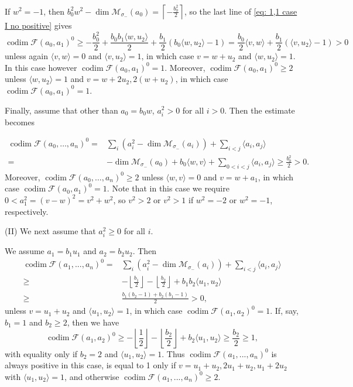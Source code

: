 \documentclass[leqno,11pt]{amsart}
\def\codim{\mathop{\mathrm{codim}}\nolimits}
\def\dim{\mathop{\mathrm{dim}}\nolimits}
\theoremstyle{definition}
\def\FF{\ensuremath{\mathcal F}}
\def\MM{\ensuremath{\mathcal M}}
\begin{document}
If $w^2=-1$, then $b_0^2w^2-\dim\MM_{\sigma_-}(a_0)=\left\lceil-\frac{b_0^2}{2}\right\rceil$, so the last line of \eqref{eq: 1,1 case I no positive} gives $$\codim\FF(a_0,a_1)^0\geq-\frac{b_0^2}{2}+\frac{b_0 b_1\langle w,u_2\rangle}{2}+\frac{b_1}{2}(b_0\langle w,u_2\rangle-1)=\frac{b_0}{2}\langle v,w\rangle+\frac{b_1}{2}(\langle v,u_2\rangle-1)>0$$
unless again $\langle v,w\rangle=0$ and $\langle v,u_2\rangle=1$, in which case $v=w+u_2$ and $\langle w,u_2\rangle=1$.  In this case however $\codim \FF(a_0,a_1)^0=1$.  Moreover, $\codim \FF(a_0,a_1)^0\geq 2$ unless $\langle w,u_2\rangle=1$ and $v=w+2u_2,2(w+u_2)$, in which case $\codim\FF(a_0,a_1)^0=1$.  

Finally, assume that other than $a_0=b_0 w$, $a_i^2>0$ for all $i>0$.  Then the estimate becomes 

\begin{equation}\label{eq: 1,1 case I no isotropic}
\begin{split}
\codim\FF(a_0,\ldots,a_n)^0=&\sum_i (a_i^2-\dim \MM_{\sigma_-}(a_i))+\sum_{i<j}\langle a_i,a_j \rangle\\
= & -\dim\MM_{\sigma_-}(a_0)+b_0\langle w,v\rangle+\sum_{0<i<j}\langle a_i,a_j\rangle\geq \frac{b_0^2}{2}>0.
\end{split}
\end{equation}
Moreover, $\codim\FF(a_0,\ldots,a_n)^0\geq 2$ unless $\langle w,v\rangle=0$ and $v=w+a_1$, in which case $\codim\FF(a_0,a_1)^0=1$.  Note that in this case we require $0<a_1^2=(v-w)^2=v^2+w^2$, so $v^2>2$ or $v^2>1$ if $w^2=-2$ or $w^2=-1$, respectively.

(II) We next assume that $a_i^2 \geq 0$ for all $i$.
 

We assume $a_1=b_1 u_1$ and $a_2=b_2 u_2$.
Then 
 \begin{equation}\label{eq: spherical 1,1 case II,a}
\begin{split}
\codim\FF(a_1,...,a_n)^0=& \sum_i (a_i^2-\dim \MM_{\sigma_-}(a_i))+\sum_{i<j}\langle a_i,a_j \rangle\\
\geq &
-\left\lfloor\frac{b_1}{2}\right\rfloor-\left\lfloor\frac{b_2}{2}\right\rfloor+b_1 b_2 \langle u_1,u_2 \rangle\\
\geq &\frac{b_1(b_2-1)+b_2(b_1-1)}{2}>0,
\end{split}
\end{equation}
unless $v=u_1+u_2$ and $\langle u_1,u_2\rangle=1$, in which case $\codim\FF(a_1,a_2)^0=1$.  If, say, $b_1=1$ and $b_2\geq 2$, then we have $$\codim\FF(a_1,a_2)^0\geq-\left\lfloor\frac{1}{2}\right\rfloor-\left\lfloor\frac{b_2}{2}\right\rfloor+b_2\langle u_1,u_2\rangle\geq \frac{b_2}{2}\geq 1,$$ with equality only if $b_2=2$ and $\langle u_1,u_2\rangle=1$.  Thus $\codim\FF(a_1,...,a_n)^0$ is always positive in this case, is equal to 1 only if $v=u_1+u_2,2u_1+u_2,u_1+2u_2$ with $\langle u_1,u_2\rangle=1$, and otherwise $\codim\FF(a_1,...,a_n)^0\geq 2$.
\end{document}
